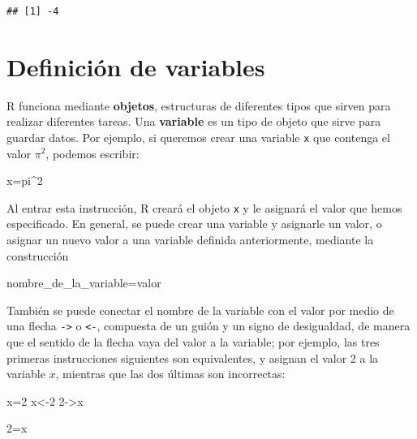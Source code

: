 \documentclass[]{book}
\newenvironment{Shaded}{\begin{snugshade}}{\end{snugshade}}
\newcommand{\DecValTok}[1]{\textcolor[rgb]{0.00,0.00,0.81}{#1}}
\newcommand{\NormalTok}[1]{#1}
\newcommand{\OperatorTok}[1]{\textcolor[rgb]{0.81,0.36,0.00}{\textbf{#1}}}
\theoremstyle{definition}
\theoremstyle{definition}
\theoremstyle{definition}
\theoremstyle{remark}
\begin{document}
\begin{verbatim}
## [1] -4
\end{verbatim}

\hypertarget{definicion-de-variables}{%
\section{Definición de variables}\label{definicion-de-variables}}

R funciona mediante \textbf{objetos}, estructuras de diferentes tipos que sirven para realizar diferentes tareas. Una \textbf{variable} es un tipo de objeto que sirve para guardar datos.
Por ejemplo, si queremos crear una variable \texttt{x} que contenga el valor \(\pi^2\), podemos escribir:

\begin{Shaded}
\begin{Highlighting}[]
\NormalTok{x=pi}\OperatorTok{^}\DecValTok{2}
\end{Highlighting}
\end{Shaded}

Al entrar esta instrucción, R creará el objeto \texttt{x} y le asignará el valor que hemos especificado.
En general, se puede crear una variable y asignarle un valor, o asignar un nuevo valor a una variable definida anteriormente, mediante
la construcción

\begin{Shaded}
\begin{Highlighting}[]
\NormalTok{nombre_de_la_variable=valor}
\end{Highlighting}
\end{Shaded}

También se puede conectar el nombre de la variable con el valor por medio de una flecha \texttt{-\textgreater{}} o \texttt{\textless{}-}, compuesta de un guión y un signo de desigualdad, de manera que el sentido de la flecha vaya del valor a la variable; por ejemplo, las tres primeras instrucciones siguientes son equivalentes, y asignan el valor 2 a la variable \(x\), mientras que las dos últimas son incorrectas:

\begin{Shaded}
\begin{Highlighting}[]
\NormalTok{x=}\DecValTok{2}
\NormalTok{x<-}\DecValTok{2}
\DecValTok{2}\NormalTok{->x}
\end{Highlighting}
\end{Shaded}

\begin{Shaded}
\begin{Highlighting}[]
\DecValTok{2}\NormalTok{=x}
\end{Highlighting}
\end{Shaded}
\end{document}
